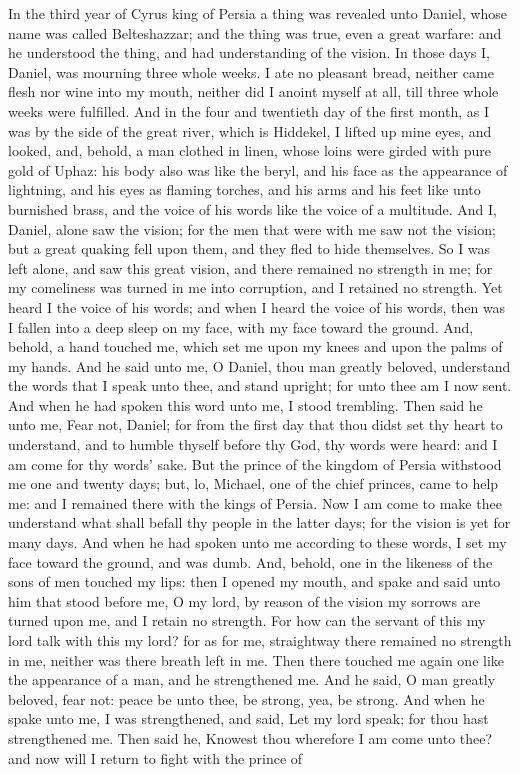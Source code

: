 In the third year of Cyrus king of Persia a thing was revealed unto Daniel, whose name was called Belteshazzar; and the thing was true, even a great warfare: and he understood the thing, and had understanding of the vision. In those days I, Daniel, was mourning three whole weeks. I ate no pleasant bread, neither came flesh nor wine into my mouth, neither did I anoint myself at all, till three whole weeks were fulfilled. And in the four and twentieth day of the first month, as I was by the side of the great river, which is Hiddekel, I lifted up mine eyes, and looked, and, behold, a man clothed in linen, whose loins were girded with pure gold of Uphaz: his body also was like the beryl, and his face as the appearance of lightning, and his eyes as flaming torches, and his arms and his feet like unto burnished brass, and the voice of his words like the voice of a multitude. And I, Daniel, alone saw the vision; for the men that were with me saw not the vision; but a great quaking fell upon them, and they fled to hide themselves. So I was left alone, and saw this great vision, and there remained no strength in me; for my comeliness was turned in me into corruption, and I retained no strength. Yet heard I the voice of his words; and when I heard the voice of his words, then was I fallen into a deep sleep on my face, with my face toward the ground.  And, behold, a hand touched me, which set me upon my knees and upon the palms of my hands. And he said unto me, O Daniel, thou man greatly beloved, understand the words that I speak unto thee, and stand upright; for unto thee am I now sent. And when he had spoken this word unto me, I stood trembling. Then said he unto me, Fear not, Daniel; for from the first day that thou didst set thy heart to understand, and to humble thyself before thy God, thy words were heard: and I am come for thy words’ sake. But the prince of the kingdom of Persia withstood me one and twenty days; but, lo, Michael, one of the chief princes, came to help me: and I remained there with the kings of Persia. Now I am come to make thee understand what shall befall thy people in the latter days; for the vision is yet for many days. And when he had spoken unto me according to these words, I set my face toward the ground, and was dumb. And, behold, one in the likeness of the sons of men touched my lips: then I opened my mouth, and spake and said unto him that stood before me, O my lord, by reason of the vision my sorrows are turned upon me, and I retain no strength. For how can the servant of this my lord talk with this my lord? for as for me, straightway there remained no strength in me, neither was there breath left in me.  Then there touched me again one like the appearance of a man, and he strengthened me. And he said, O man greatly beloved, fear not: peace be unto thee, be strong, yea, be strong. And when he spake unto me, I was strengthened, and said, Let my lord speak; for thou hast strengthened me. Then said he, Knowest thou wherefore I am come unto thee? and now will I return to fight with the prince of 